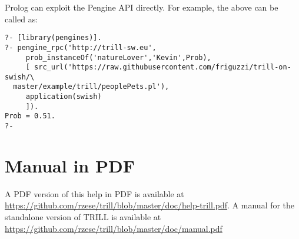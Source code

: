 \documentclass[a4paper,10pt]{scrartcl}
\begin{document}
Prolog can exploit the Pengine API directly.  For example, the above can
be called as:
\begin{verbatim}
?- [library(pengines)].
?- pengine_rpc('http://trill-sw.eu',
     prob_instanceOf('natureLover','Kevin',Prob),
     [ src_url('https://raw.githubusercontent.com/friguzzi/trill-on-swish/\
  master/example/trill/peoplePets.pl'),
     application(swish)
     ]).
Prob = 0.51.
?-
\end{verbatim}

\section{Manual in PDF}
A PDF version of this help in PDF is available at
\url{https://github.com/rzese/trill/blob/master/doc/help-trill.pdf}.
A manual for the standalone version of TRILL is available at \url{https://github.com/rzese/trill/blob/master/doc/manual.pdf}





\appendix

\end{document}

